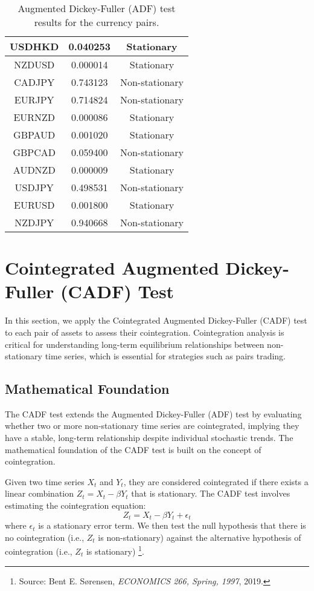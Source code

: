 \documentclass{article}
\begin{document}
\begin{table}[h]
\begin{tabular}{|c|c|c|}
        \hline
        USDHKD & 0.040253 & Stationary \\
        \hline
        NZDUSD & 0.000014 & Stationary \\
        \hline
        CADJPY & 0.743123 & Non-stationary \\
        \hline
        EURJPY & 0.714824 & Non-stationary \\
        \hline
        EURNZD & 0.000086 & Stationary \\
        \hline
        GBPAUD & 0.001020 & Stationary \\
        \hline
        GBPCAD & 0.059400 & Non-stationary \\
        \hline
        AUDNZD & 0.000009 & Stationary \\
        \hline
        USDJPY & 0.498531 & Non-stationary \\
        \hline
        EURUSD & 0.001800 & Stationary \\
        \hline
        NZDJPY & 0.940668 & Non-stationary \\
        \hline
    \end{tabular}
    \caption{Augmented Dickey-Fuller (ADF) test results for the currency pairs.}
    \label{tab:ADF_results}
\end{table}
\clearpage





\section*{Cointegrated Augmented Dickey-Fuller (CADF) Test}
In this section, we apply the Cointegrated Augmented Dickey-Fuller (CADF) test to each pair of assets to assess their cointegration. Cointegration analysis is critical for understanding long-term equilibrium relationships between non-stationary time series, which is essential for strategies such as pairs trading.

\subsection{Mathematical Foundation}
The CADF test extends the Augmented Dickey-Fuller (ADF) test by evaluating whether two or more non-stationary time series are cointegrated, implying they have a stable, long-term relationship despite individual stochastic trends. The mathematical foundation of the CADF test is built on the concept of cointegration.

Given two time series \( X_t \) and \( Y_t \), they are considered cointegrated if there exists a linear combination \( Z_t = X_t - \beta Y_t \) that is stationary. The CADF test involves estimating the cointegration equation:
\[
Z_t = X_t - \beta Y_t + \epsilon_t
\]
where \( \epsilon_t \) is a stationary error term. We then test the null hypothesis that there is no cointegration (i.e., \( Z_t \) is non-stationary) against the alternative hypothesis of cointegration (i.e., \( Z_t \) is stationary) \footnote{Source: Bent E. Sørensen, \textit{ECONOMICS 266, Spring, 1997}, 2019.}.
\end{document}
